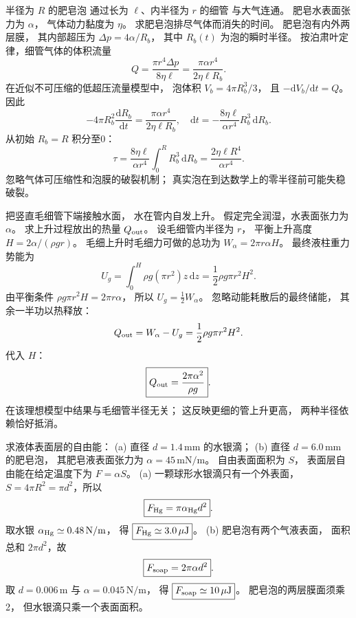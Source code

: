 半径为 $R$ 的肥皂泡
通过长为 $\ell$、内半径为 $r$ 的细管
与大气连通。
肥皂水表面张力为 $\alpha$，
气体动力黏度为 $\eta$。
求肥皂泡排尽气体而消失的时间。
\exsolution
肥皂泡有内外两层膜，
其内部超压为
$\Delta p=4\alpha/R_b$，
其中 $R_b(t)$ 为泡的瞬时半径。
按泊肃叶定律，细管气体的体积流量
\[
Q=\frac{\pi r^4\Delta p}{8\eta\ell}
=\frac{\pi\alpha r^4}{2\eta\ell R_b}.
\]
在近似不可压缩的低超压流量模型中，
泡体积
$V_b=4\pi R_b^3/3$，
且 $-\mathrm dV_b/\mathrm dt=Q$。
因此
\[
-4\pi R_b^2\frac{\mathrm dR_b}{\mathrm dt}
=\frac{\pi\alpha r^4}{2\eta\ell R_b},
\quad
\mathrm dt=-\frac{8\eta\ell}{\alpha r^4}R_b^3\,\mathrm dR_b.
\]
从初始 $R_b=R$ 积分至0：
\[
\boxed{\tau=\frac{8\eta\ell}{\alpha r^4}
\int_0^R R_b^3\,\mathrm dR_b
=\frac{2\eta\ell R^4}{\alpha r^4}}.
\]
\excheck 忽略气体可压缩性和泡膜的破裂机制；
真实泡在到达数学上的零半径前可能失稳破裂。

把竖直毛细管下端接触水面，
水在管内自发上升。
假定完全润湿，水表面张力为 $\alpha$。
求上升过程放出的热量 $Q_{\rm out}$。
\exsolution
设毛细管内半径为 $r$，
平衡上升高度
$H=2\alpha/(\rho gr)$。
毛细上升时毛细力可做的总功为
$W_\alpha=2\pi r\alpha H$。
最终液柱重力势能为
\[
U_g=\int_0^H\rho g(\pi r^2)z\,\mathrm dz
=\frac12\rho g\pi r^2H^2.
\]
由平衡条件
$\rho g\pi r^2H=2\pi r\alpha$，
所以
$U_g=\tfrac12W_\alpha$。
忽略动能耗散后的最终储能，
其余一半功以热释放：
\[
Q_{\rm out}=W_\alpha-U_g
=\frac12\rho g\pi r^2H^2.
\]
代入 $H$：
\[
\boxed{Q_{\rm out}=\frac{2\pi\alpha^2}{\rho g}}.
\]
\excheck 在该理想模型中结果与毛细管半径无关；
这反映更细的管上升更高，
两种半径依赖恰好抵消。

求液体表面层的自由能：
(a) 直径 $d=1.4\,\mathrm{mm}$ 的水银滴；
(b) 直径 $d=6.0\,\mathrm{mm}$ 的肥皂泡，
其肥皂液表面张力为
$\alpha=45\,\mathrm{mN/m}$。
\exsolution
自由表面面积为 $S$，
表面层自由能在给定温度下为
$F=\alpha S$。
(a) 一颗球形水银滴只有一个外表面，
$S=4\pi R^2=\pi d^2$，所以
\[
\boxed{F_{\rm Hg}=\pi\alpha_{\rm Hg}d^2}.
\]
取水银
$\alpha_{\rm Hg}\simeq0.48\,\mathrm{N/m}$，
得
$\boxed{F_{\rm Hg}\simeq3.0\,\mathrm{\mu J}}$。
(b) 肥皂泡有两个气液表面，
面积总和 $2\pi d^2$，故
\[
\boxed{F_{\rm soap}=2\pi\alpha d^2}.
\]
取 $d=0.006\,\mathrm m$ 与
$\alpha=0.045\,\mathrm{N/m}$，
得
$\boxed{F_{\rm soap}\simeq10\,\mathrm{\mu J}}$。
\excheck 肥皂泡的两层膜面须乘2，
但水银滴只乘一个表面面积。
